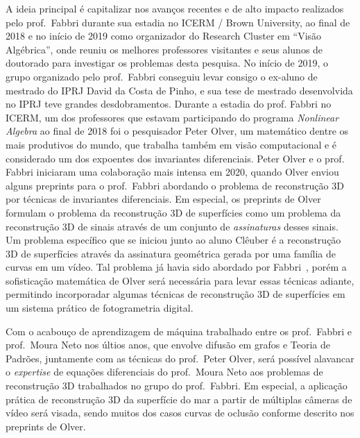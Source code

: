 \documentclass[a4paper,titlepage]{article}
\begin{document}
A ideia principal é capitalizar nos avanços recentes e de alto impacto
realizados pelo prof.\ Fabbri durante sua estadia no ICERM / Brown University,
ao final de 2018 e no início de 2019 como organizador do Research Cluster em
``Visão Algébrica'', onde reuniu os melhores professores visitantes e seus alunos
de doutorado para investigar os problemas desta pesquisa. No início de 2019, o
grupo organizado pelo prof.\ Fabbri conseguiu levar consigo o ex-aluno de
mestrado do IPRJ David da Costa de Pinho, e sua tese de mestrado desenvolvida no
IPRJ teve grandes desdobramentos. Durante a estadia do prof. Fabbri no ICERM,
um dos professores que estavam participando do programa \emph{Nonlinear
Algebra} ao final de 2018 foi o pesquisador Peter Olver, um matemático dentre os
mais produtivos do mundo, que trabalha também em visão computacional e é
considerado um dos expoentes dos invariantes diferenciais. Peter Olver e o prof.
Fabbri iniciaram uma colaboração mais intensa em 2020, quando Olver enviou
alguns preprints para o prof.\ Fabbri abordando o problema de reconstrução 3D
por técnicas de invariantes diferenciais. Em especial, os preprints de Olver
formulam o problema da reconstrução 3D de superfícies como um problema da
reconstrução 3D de sinais através de um conjunto de \emph{assinaturas} desses
sinais. Um problema específico que se iniciou junto ao aluno Clêuber é a
reconstrução 3D de superfícies através da assinatura geométrica gerada por uma
família de curvas em um vídeo. Tal problema já havia sido abordado por
Fabbri~\cite{Fabbri:Kimia:IJCV2016}, porém a sofisticação matemática de Olver
será necessária para levar essas técnicas adiante, permitindo
incorporadar algumas técnicas de reconstrução 3D de superfícies em um sistema
prático de fotogrametria digital.

Com o acabouço de aprendizagem de máquina trabalhado entre os prof.\ Fabbri e
prof.\ Moura Neto nos últios anos, que envolve difusão em grafos e Teoria de
Padrões, juntamente com as técnicas do prof.\ Peter Olver, será possível
alavancar o \emph{expertise} de equações diferenciais do prof.\ Moura Neto aos problemas de
reconstrução 3D trabalhados no grupo do prof.\ Fabbri. Em especial, a aplicação
prática de reconstrução 3D da superfície do mar a partir de múltiplas câmeras de
vídeo será visada, sendo muitos dos casos curvas de oclusão conforme descrito
nos preprints de Olver.
\end{document}
